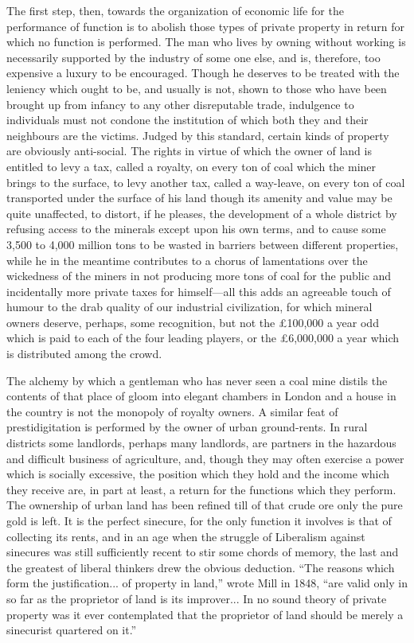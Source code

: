 \documentclass{book}
\begin{document}
The first step, then, towards the organization of economic life for the performance of function is to abolish those types of private property in return for which no function is performed. The man who lives by owning without working is necessarily supported by the industry of some one else, and is, therefore, too expensive a luxury to be encouraged. Though he deserves to be treated with the leniency which ought to be, and usually is not, shown to those who have been brought up from infancy to any other disreputable trade, indulgence to individuals must not condone the institution of which both they and their neighbours are the victims. Judged by this standard, certain kinds of property are obviously anti-social. The rights in virtue of which the owner of land is entitled to levy a tax, called a royalty, on every ton of coal which the miner brings to the surface, to levy another tax, called a way-leave, on every ton of coal transported under the surface of his land though its amenity and value may be quite unaffected, to distort, if he pleases, the development of a whole district by refusing access to the minerals except upon his own terms, and to cause some 3,500 to 4,000 million tons to be wasted in barriers between different properties, while he in the meantime contributes to a chorus of lamentations over the wickedness of the miners in not producing more tons of coal for the public and incidentally more private taxes for himself—all this adds an agreeable touch of humour to the drab quality of our industrial civilization, for which mineral owners deserve, perhaps, some recognition, but not the £100,000 a year odd which is paid to each of the four leading players, or the £6,000,000 a year which is distributed among the crowd.

The alchemy by which a gentleman who has never seen a coal mine distils the contents of that place of gloom into elegant chambers in London and a house in the country is not the monopoly of royalty owners. A similar feat of prestidigitation is performed by the owner of urban ground-rents. In rural districts some landlords, perhaps many landlords, are partners in the hazardous and difficult business of agriculture, and, though they may often exercise a power which is socially excessive, the position which they hold and the income which they receive are, in part at least, a return for the functions which they perform. The ownership of urban land has been refined till of that crude ore only the pure gold is left. It is the perfect sinecure, for the only function it involves is that of collecting its rents, and in an age when the struggle of Liberalism against sinecures was still sufficiently recent to stir some chords of memory, the last and the greatest of liberal thinkers drew the obvious deduction. “The reasons which form the justification... of property in land,” wrote Mill in 1848, “are valid only in so far as the proprietor of land is its improver... In no sound theory of private property was it ever contemplated that the proprietor of land should be merely a sinecurist quartered on it.”
\end{document}
